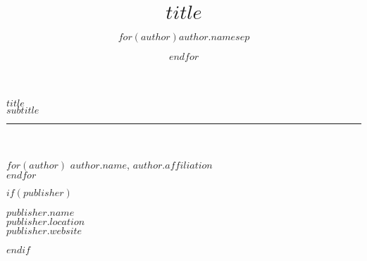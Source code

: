 \documentclass{book}
\title{$title$}
\author{$for(author)$$author.name$$sep$ \and $endfor$}
\begin{document}
\frontmatter

\begin{titlepage}
\begin{flushleft}

\textbf{\fontsize{48}{54}\selectfont $title$ \\}
\textbf{\large \textit{$subtitle$}}

\par\noindent\rule{\textwidth}{4pt}\\

\begin{flushright}

  $for(author)$
    \textbf{$author.name$}, \emph{$author.affiliation$}\\
  $endfor$

\end{flushright}

\vspace{\fill}

\end{flushleft}
$if(publisher)$
\begin{center}
  \small{$publisher.name$\\
  $publisher.location$\\
  $publisher.website$}
\end{center}
$endif$  
\end{titlepage}
\restoregeometry

\thispagestyle{empty}
\end{document}
